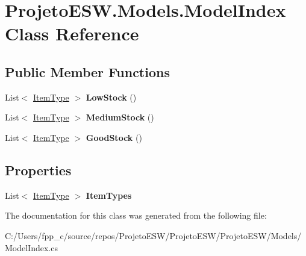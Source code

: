 \hypertarget{class_projeto_e_s_w_1_1_models_1_1_model_index}{}\section{Projeto\+E\+S\+W.\+Models.\+Model\+Index Class Reference}
\label{class_projeto_e_s_w_1_1_models_1_1_model_index}
\subsection*{Public Member Functions}
\begin{DoxyCompactItemize}
\item 
\mbox{\label{class_projeto_e_s_w_1_1_models_1_1_model_index_a1b14b6245c8966ef13a660554d49f2b5}} 
List$<$ \mbox{\hyperlink{class_projeto_e_s_w_1_1_models_1_1_stock_1_1_item_type}{Item\+Type}} $>$ {\bfseries Low\+Stock} ()
\item 
\mbox{\label{class_projeto_e_s_w_1_1_models_1_1_model_index_a8b7a59d6b29a00cc1dededc9f54e3f4b}} 
List$<$ \mbox{\hyperlink{class_projeto_e_s_w_1_1_models_1_1_stock_1_1_item_type}{Item\+Type}} $>$ {\bfseries Medium\+Stock} ()
\item 
\mbox{\label{class_projeto_e_s_w_1_1_models_1_1_model_index_ac442e39fd6937636b9bda257472548b1}} 
List$<$ \mbox{\hyperlink{class_projeto_e_s_w_1_1_models_1_1_stock_1_1_item_type}{Item\+Type}} $>$ {\bfseries Good\+Stock} ()
\end{DoxyCompactItemize}
\subsection*{Properties}
\begin{DoxyCompactItemize}
\item 
\mbox{\label{class_projeto_e_s_w_1_1_models_1_1_model_index_ade8a81b7826c8eeb6b036967a4b113a4}} 
List$<$ \mbox{\hyperlink{class_projeto_e_s_w_1_1_models_1_1_stock_1_1_item_type}{Item\+Type}} $>$ {\bfseries Item\+Types}
\end{DoxyCompactItemize}


The documentation for this class was generated from the following file\+:\begin{DoxyCompactItemize}
\item 
C\+:/\+Users/fpp\+\_\+c/source/repos/\+Projeto\+E\+S\+W/\+Projeto\+E\+S\+W/\+Projeto\+E\+S\+W/\+Models/Model\+Index.\+cs\end{DoxyCompactItemize}
